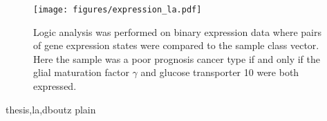 \begin{figure}[p] \texttt{[image: figures/expression\_la.pdf]}

\caption[Logic analysis of binary gene expression data.]{ Logic analysis was
performed on binary expression data where pairs of gene expression states were
compared to the sample class vector.  Here the sample was a poor prognosis
cancer type if and only if the glial maturation factor $\gamma$ and glucose
transporter 10 were both expressed.}

\label{gene_la}

\end{figure}



 {thesis,la,dboutz}    %
 {plain}


